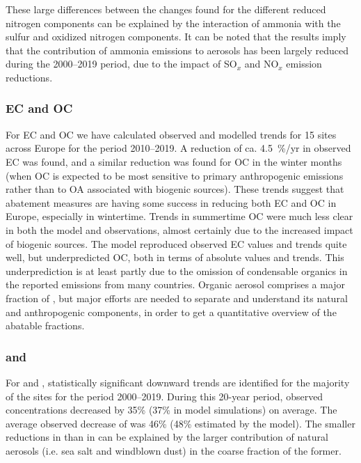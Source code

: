These large differences between the changes found for the different reduced nitrogen components can be explained by the interaction of ammonia with the sulfur and oxidized nitrogen components. It can be noted that the results imply that the contribution of ammonia emissions to aerosols has been largely reduced during the 2000--2019 period, due to the impact of SO$_x$ and NO$_x$ emission reductions. 



\subsubsection*{EC and OC}
For EC and OC we have calculated observed and modelled trends for 15 sites across Europe for the period 2010--2019. A reduction of ca. 4.5~\%/yr in observed EC was found, and a similar reduction was found for OC in the winter months (when OC is expected to be most sensitive to primary anthropogenic emissions rather than to OA associated with biogenic sources). These trends suggest that abatement measures are having some success in reducing both EC and OC in Europe, especially in wintertime. 
Trends in summertime OC were much less clear in both the model and observations, almost certainly due to the increased impact of biogenic sources.
The model reproduced observed EC values and trends quite well, but underpredicted OC, both in terms of absolute values and trends. This underprediction is at least partly due to the omission of condensable organics in the reported emissions from many countries. 
Organic aerosol comprises a major fraction of \pmfine, but major efforts are needed to separate and understand its natural and anthropogenic components, in order to get a quantitative overview of the abatable fractions.
%
\subsubsection*{\PM[10] and \PM[2.5]}
For \PM[10] and \PM[2.5], statistically significant downward trends are identified for the majority of the sites for the period 2000--2019.
During this 20-year period, observed \PM[10] concentrations decreased by 35\%  (37\% in model simulations) on average. 
The average observed decrease of \PM[2.5] was 46\%  (48\% estimated by the model). The smaller reductions in \PM[10] than in \PM[2.5] can be explained by the larger contribution of natural aerosols (i.e. sea salt and windblown dust) in the coarse fraction of the former. 


